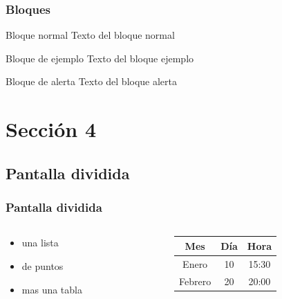 \documentclass{beamer}
\begin{document}
\begin{frame}
    \frametitle{Bloques}

    \begin{block}{Bloque normal}
        Texto del bloque normal
    \end{block}

    \begin{exampleblock}{Bloque de ejemplo}
        Texto del bloque ejemplo
    \end{exampleblock}

    \begin{alertblock}{Bloque de alerta}
        Texto del bloque alerta
    \end{alertblock}
\end{frame}

\section{Sección 4}
\subsection{Pantalla dividida}

\begin{frame}
    \frametitle{Pantalla dividida}
    \begin{columns}
        \begin{column}{5cm}
            \begin{itemize}
                \item una lista
                \item de puntos
                \item mas una tabla
            \end{itemize}
        \end{column}
        \begin{column}{5cm}
            \begin{tabular}{|c|c|c|} \hline
                \textbf{Mes} & \textbf{Día} & \textbf{Hora} \\ \hline
                Enero        & 10           & 15:30         \\ \hline
                Febrero      & 20           & 20:00         \\ \hline
            \end{tabular}
        \end{column}
    \end{columns}
\end{frame}
\end{document}
